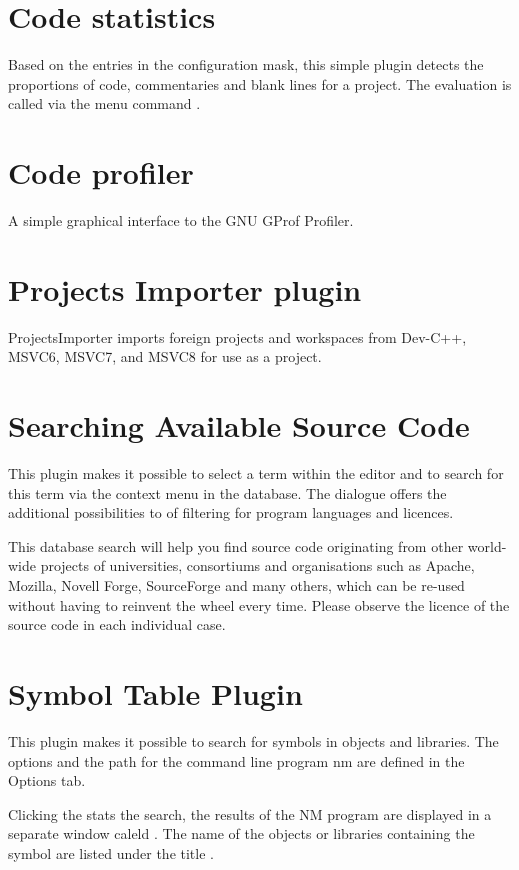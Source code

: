 \section{Code statistics}


Based on the entries in the configuration mask, this simple plugin detects the proportions of code, commentaries and blank lines for a project. The evaluation is called via the menu command .


\section{Code profiler}

A simple graphical interface to the GNU GProf Profiler.


\section{Projects Importer plugin}

ProjectsImporter imports foreign projects and workspaces from Dev-C++, MSVC6, MSVC7, and MSVC8 for use as a \codeblocks project. 


\section{Searching Available Source Code}

This plugin makes it possible to select a term within the editor and to search for this term via the context menu  in the \cite{url:koders} database. The dialogue offers the additional possibilities to of filtering for program languages and licences.


This database search will help you find source code originating from other world-wide projects of universities, consortiums and organisations such as Apache, Mozilla, Novell Forge, SourceForge and many others, which can be re-used without having to reinvent the wheel every time. Please observe the licence of the source code in each individual case.


\section{Symbol Table Plugin}

This plugin makes it possible to search for symbols in objects and libraries. The options and the path for the command line program nm are defined in the Options tab.


Clicking the  stats the search, the results of the NM program are displayed in a separate window caleld . The name of the objects or libraries containing the symbol are listed under the title .

